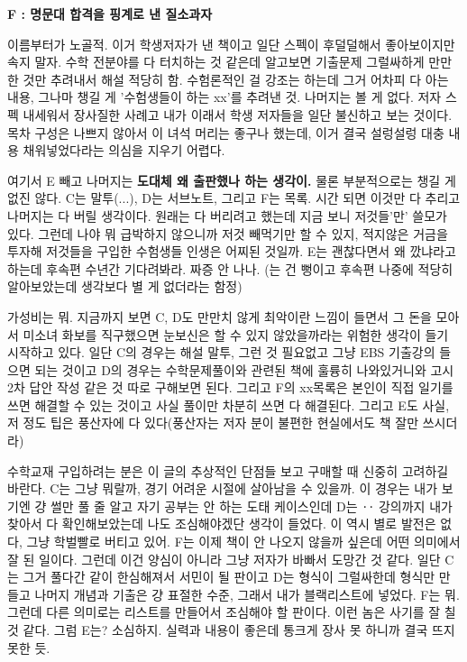 \textbf{F : 명문대 합격을 핑계로 낸 질소과자}
\vspace{5mm}

이름부터가 노골적. 이거 학생저자가 낸 책이고 일단 스펙이 후덜덜해서 좋아보이지만 속지 말자.
수학 전분야를 다 터치하는 것 같은데 알고보면 기출문제 그럴싸하게 만만한 것만 추려내서 해설 적당히 함.
수험론적인 걸 강조는 하는데 그거 어차피 다 아는 내용, 그나마 챙길 게 '수험생들이 하는 xx'를 추려낸 것.
나머지는 볼 게 없다. 저자 스펙 내세워서 장사질한 사례고 내가 이래서 학생 저자들을 일단 불신하고 보는 것이다.
목차 구성은 나쁘지 않아서 이 녀석 머리는 좋구나 했는데, 이거 결국 설렁설렁 대충 내용 채워넣었다라는 의심을 지우기 어렵다.
\vspace{5mm}

여기서 E 빼고 나머지는 \textbf{도대체 왜 출판했나 하는 생각이.}
물론 부분적으로는 챙길 게 없진 않다.
C는 말투(...), D는 서브노트, 그리고 F는 목록. 시간 되면 이것만 다 추리고 나머지는 다 버릴 생각이다.
원래는 다 버리려고 했는데 지금 보니 저것들'만' 쓸모가 있다.
그런데 나야 뭐 급박하지 않으니까 저것 빼먹기만 할 수 있지, 적지않은 거금을 투자해 저것들을 구입한 수험생들 인생은 어찌된 것일까.
E는 괜찮다면서 왜 깠냐라고 하는데 후속편 수년간 기다려봐라. 짜증 안 나나.
(는 건 뻥이고 후속편 나중에 적당히 알아보았는데 생각보다 별 게 없더라는 함정)
\vspace{5mm}

가성비는 뭐. 지금까지 보면 C, D도 만만치 않게 최악이란 느낌이 들면서
그 돈을 모아서 미소녀 화보를 직구했으면 눈보신은 할 수 있지 않았을까라는 위험한 생각이 들기 시작하고 있다.
일단 C의 경우는 해설 말투, 그런 것 필요없고 그냥 EBS 기출강의 들으면 되는 것이고
D의 경우는 수학문제풀이와 관련된 책에 훌륭히 나와있거니와 고시 2차 답안 작성 같은 것 따로 구해보면 된다.
그리고 F의 xx목록은 본인이 직접 일기를 쓰면 해결할 수 있는 것이고 사실 풀이만 차분히 쓰면 다 해결된다.
그리고 E도 사실, 저 정도 팁은 풍산자에 다 있다(풍산자는 저자 분이 불편한 현실에서도 책 잘만 쓰시더라)
\vspace{5mm}

수학교재 구입하려는 분은 이 글의 추상적인 단점들 보고 구매할 때 신중히 고려하길 바란다.
C는 그냥 뭐랄까, 경기 어려운 시절에 살아남을 수 있을까. 이 경우는 내가 보기엔 걍 썰만 풀 줄 알고 자기 공부는 안 하는 도태 케이스인데
D는 ‥ 강의까지 내가 찾아서 다 확인해보았는데 나도 조심해야겠단 생각이 들었다. 이 역시 별로 발전은 없다, 그냥 학벌빨로 버티고 있어.
F는 이제 책이 안 나오지 않을까 싶은데 어떤 의미에서 잘 된 일이다. 그런데 이건 양심이 아니라 그냥 저자가 바빠서 도망간 것 같다.
일단 C는 그거 풀다간 같이 한심해져서 서민이 될 판이고
D는 형식이 그럴싸한데 형식만 만들고 나머지 개념과 기출은 걍 표절한 수준, 그래서 내가 블랙리스트에 넣었다.
F는 뭐. 그런데 다른 의미로는 리스트를 만들어서 조심해야 할 판이다. 이런 놈은 사기를 잘 칠 것 같다.
그럼 E는? 소심하지. 실력과 내용이 좋은데 통크게 장사 못 하니까 결국 뜨지 못한 듯.
\vspace{5mm}

